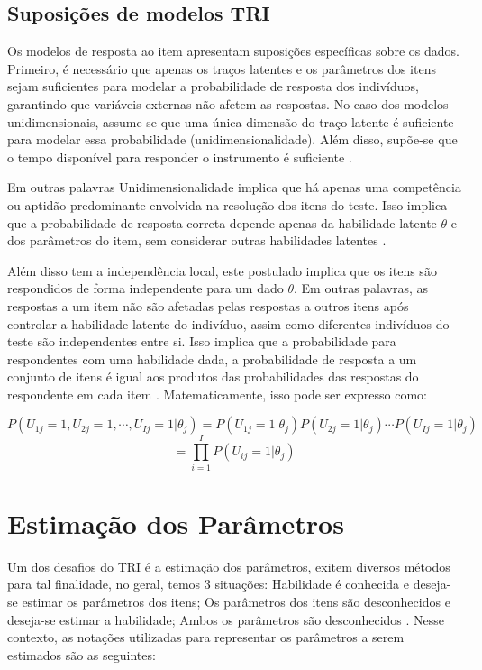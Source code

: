 \subsection{Suposições de modelos TRI}


Os modelos de resposta ao item apresentam suposições específicas sobre os dados. Primeiro, é necessário que apenas os traços latentes e os parâmetros dos itens sejam suficientes para modelar a probabilidade de resposta dos indivíduos, garantindo que variáveis externas não afetem as respostas.  No caso dos modelos unidimensionais, assume-se que uma única dimensão do traço latente é suficiente para modelar essa probabilidade (unidimensionalidade). Além disso, supõe-se que o tempo disponível para responder o instrumento é suficiente \cite{caio2010}.


Em outras palavras Unidimensionalidade implica que há apenas uma competência ou aptidão predominante envolvida na resolução dos itens do teste. Isso implica que a probabilidade de resposta correta depende apenas da habilidade latente $\theta$ e dos parâmetros do item, sem considerar outras habilidades latentes \cite{pasquali1996}.


Além disso tem a independência local, este postulado implica que os itens são respondidos de forma independente para um dado $\theta$. Em outras palavras, as respostas a um item não são afetadas pelas respostas a outros itens após controlar a habilidade latente do indivíduo, assim como diferentes indivíduos do teste são independentes entre si. Isso implica que a probabilidade para respondentes com uma habilidade dada, a probabilidade de resposta a um conjunto de itens é igual aos produtos das probabilidades das respostas do respondente em cada item \cite{pasquali1996}. Matematicamente, isso pode ser expresso como:


\[
 P(U_{1j} = 1, U_{2j} = 1, \cdots, U_{Ij} = 1 |\theta_j) = 
 P(U_{1j} = 1|\theta_j)  P(U_{2j} = 1|\theta_j) \cdots P(U_{Ij} = 1|\theta_j) 
\] 
\[
 = \prod_{i=1}^{I}P(U_{ij} = 1|\theta_j) 
\]


\section{Estimação dos Parâmetros}

Um dos desafios do TRI é a estimação dos parâmetros, exitem diversos métodos para tal finalidade, no geral, temos 3 situações:  Habilidade é conhecida e deseja-se estimar os parâmetros dos itens; Os parâmetros dos itens são desconhecidos e deseja-se estimar a habilidade; Ambos os parâmetros são desconhecidos \cite{de2000teoria}.  Nesse contexto, as notações utilizadas para representar os parâmetros a serem estimados são as seguintes:\\


